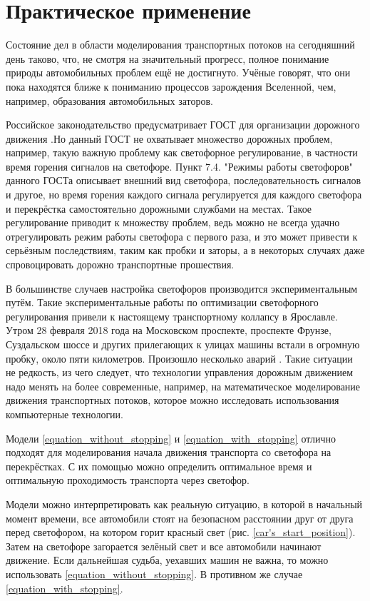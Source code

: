 \documentclass[12pt, a4paper]{extarticle}
\numberwithin{equation}{section}
\begin{document}
\section{Практическое применение} 

Состояние дел в области моделирования транспортных потоков на сегодняшний день таково, что, не смотря на значительный прогресс, полное понимание природы автомобильных проблем ещё не достигнуто. Учёные
говорят, что они пока находятся ближе к пониманию процессов зарождения Вселенной, чем, например, образования автомобильных заторов. 

Российское законодательство предусматривает ГОСТ для организации дорожного движения \cite{Gost}.Но данный ГОСТ не охватывает множество дорожных проблем, например, такую важную проблему как светофорное регулирование, в частности время горения сигналов на светофоре. Пункт 7.4. "Режимы работы светофоров"  данного ГОСТа описывает внешний вид светофора, последовательность сигналов и другое, но время горения каждого сигнала регулируется для каждого светофора и перекрёстка самостоятельно дорожными службами на местах. Такое регулирование приводит к множеству проблем, ведь можно не всегда удачно отрегулировать режим работы светофора с первого раза, и это может привести к серьёзным последствиям, таким как пробки и заторы, а в некоторых случаях даже спровоцировать дорожно транспортные прошествия.

В большинстве случаев настройка светофоров производится экспериментальным путём. Такие экспериментальные 
работы по оптимизации светофорного регулирования привели к настоящему транспортному коллапсу в Ярославле.
Утром 28 февраля 2018 года на Московском проспекте, проспекте Фрунзе, Суздальском шоссе и других прилегающих к улицах машины встали в огромную пробку, около пяти километров. Произошло несколько аварий \cite{News}. Такие ситуации не редкость, из чего следует, что технологии управления дорожным движением надо менять на более современные, например, на математическое моделирование движения транспортных потоков, которое можно исследовать использования компьютерные технологии. 

Модели \eqref{equation_without_stopping} и \eqref{equation_with_stopping} отлично подходят для моделирования начала движения транспорта со светофора на перекрёстках. С их помощью можно определить оптимальное время и оптимальную проходимость транспорта через светофор. 

Модели можно интерпретировать как реальную ситуацию, в которой в начальный момент времени, все автомобили стоят на безопасном расстоянии друг от друга перед светофором, на котором горит красный свет (рис. \ref{car's_start_position}). Затем на светофоре загорается зелёный свет и все автомобили начинают движение. Если дальнейшая судьба, уехавших машин не важна, то можно использовать \eqref{equation_without_stopping}. В противном же случае  \eqref{equation_with_stopping}.
\end{document}

